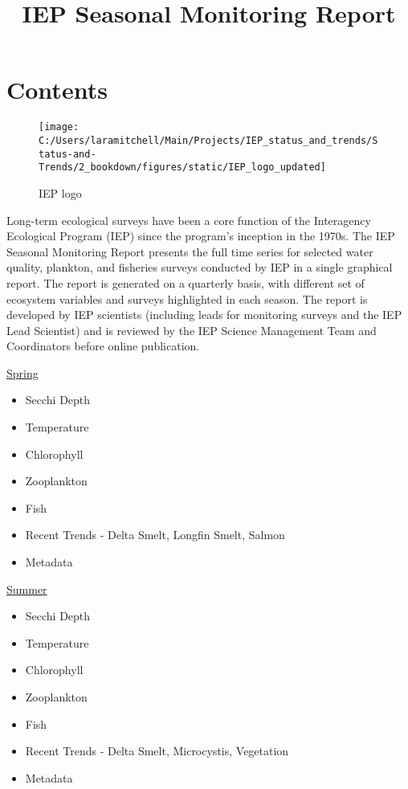 \documentclass[
]{book}
\title{IEP Seasonal Monitoring Report}
\author{}
\date{\vspace{-2.5em}}
\providecommand{\tightlist}{%
  \setlength{\itemsep}{0pt}\setlength{\parskip}{0pt}}
\begin{document}
\maketitle

{
\setcounter{tocdepth}{1}
\tableofcontents
}
\hypertarget{contents}{%
\chapter{Contents}\label{contents}}

\begin{figure}
\texttt{[image: C:/Users/laramitchell/Main/Projects/IEP\_status\_and\_trends/Status-and-Trends/2\_bookdown/figures/static/IEP\_logo\_updated]} \caption{IEP logo}\label{fig:unnamed-chunk-1}
\end{figure}

Long-term ecological surveys have been a core function of the Interagency Ecological Program (IEP) since the program's inception in the 1970s. The IEP Seasonal Monitoring Report presents the full time series for selected water quality, plankton, and fisheries surveys conducted by IEP in a single graphical report. The report is generated on a quarterly basis, with different set of ecosystem variables and surveys highlighted in each season. The report is developed by IEP scientists (including leads for monitoring surveys and the IEP Lead Scientist) and is reviewed by the IEP Science Management Team and Coordinators before online publication.

\href{Spring.html}{Spring}

\begin{itemize}
\tightlist
\item
  Secchi Depth
\item
  Temperature
\item
  Chlorophyll
\item
  Zooplankton
\item
  Fish
\item
  Recent Trends - Delta Smelt, Longfin Smelt, Salmon
\item
  Metadata
\end{itemize}

\href{Summer.html}{Summer}

\begin{itemize}
\tightlist
\item
  Secchi Depth
\item
  Temperature
\item
  Chlorophyll
\item
  Zooplankton
\item
  Fish
\item
  Recent Trends - Delta Smelt, Microcystis, Vegetation
\item
  Metadata
\end{itemize}
\end{document}
